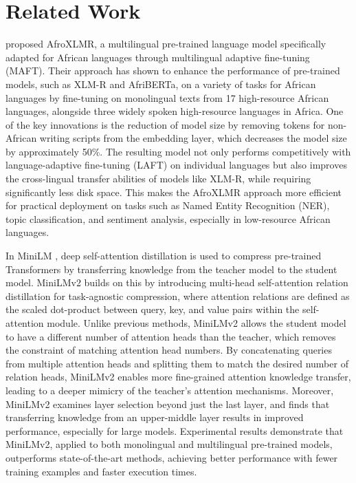 \section{Related Work}
\citet{alabi2022adapting} proposed AfroXLMR, a multilingual pre-trained language model specifically adapted for African languages through multilingual adaptive fine-tuning (MAFT). Their approach has shown to enhance the performance of pre-trained models, such as XLM-R and AfriBERTa, on a variety of tasks for African languages by fine-tuning on monolingual texts from 17 high-resource African languages, alongside three widely spoken high-resource languages in Africa. One of the key innovations is the reduction of model size by removing tokens for non-African writing scripts from the embedding layer, which decreases the model size by approximately 50\%. The resulting model not only performs competitively with language-adaptive fine-tuning (LAFT) on individual languages but also improves the cross-lingual transfer \cite{thangaraj2024crosslingual} abilities of models like XLM-R, while requiring significantly less disk space. This makes the AfroXLMR approach more efficient for practical deployment on tasks such as Named Entity Recognition (NER), topic classification, and sentiment analysis, especially in low-resource African languages.

In MiniLM \citep{wang2020minilm}, deep self-attention distillation is used to compress pre-trained Transformers by transferring knowledge from the teacher model to the student model. MiniLMv2 \citep{wang2020minilmv2} builds on this by introducing multi-head self-attention relation distillation for task-agnostic compression, where attention relations are defined as the scaled dot-product between query, key, and value pairs within the self-attention module. Unlike previous methods, MiniLMv2 allows the student model to have a different number of attention heads than the teacher, which removes the constraint of matching attention head numbers. By concatenating queries from multiple attention heads and splitting them to match the desired number of relation heads, MiniLMv2 enables more fine-grained attention knowledge transfer, leading to a deeper mimicry of the teacher’s attention mechanisms. Moreover, MiniLMv2 examines layer selection beyond just the last layer, and finds that transferring knowledge from an upper-middle layer results in improved performance, especially for large models. Experimental results demonstrate that MiniLMv2, applied to both monolingual and multilingual pre-trained models, outperforms state-of-the-art methods, achieving better performance with fewer training examples and faster execution times.


